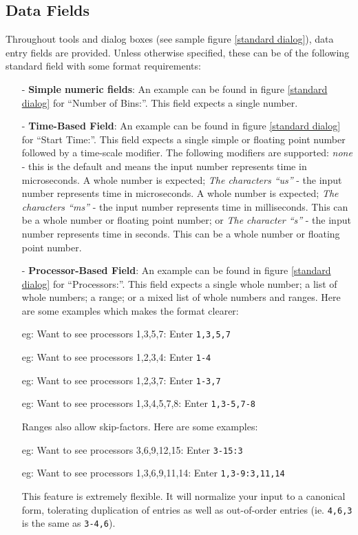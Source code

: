 \documentclass[10pt]{report}
\begin{document}
\subsection{Data Fields}

Throughout \projections{} tools and dialog boxes (see sample figure
\ref{standard dialog}), data entry fields are provided. Unless
otherwise specified, these can be of the following standard field with
some format requirements:

\begin{itemize}
\item[-] {\bf Simple numeric fields}: An example can be found in
figure \ref{standard dialog} for ``Number of Bins:''. This field expects
a single number.
\item[-] {\bf Time-Based Field}: An example can be found in figure
\ref{standard dialog} for ``Start Time:''. This field expects a single
simple or floating point number followed by a time-scale modifier. The
following modifiers are supported: {\it none} - this is the default
and means the input number represents time in microseconds. A whole
number is expected; {\it The characters ``us''} - the input number
represents time in microseconds. A whole number is expected; {\it The
characters ``ms''} - the input number represents time in
milliseconds. This can be a whole number or floating point number; or
{\it The character ``s''} - the input number represents time in
seconds. This can be a whole number or floating point number.
\item[-] {\bf Processor-Based Field}: An example can be found in
figure \ref{standard dialog} for ``Processors:''. This field expects a
single whole number; a list of whole numbers; a range; or a mixed list
of whole numbers and ranges. Here are some examples which makes the
format clearer:

   eg: Want to see processors 1,3,5,7:  Enter {\tt 1,3,5,7}

   eg: Want to see processors 1,2,3,4:  Enter {\tt 1-4}

   eg: Want to see processors 1,2,3,7:  Enter {\tt 1-3,7}

   eg: Want to see processors 1,3,4,5,7,8: Enter {\tt 1,3-5,7-8}

Ranges also allow skip-factors. Here are some examples:

   eg: Want to see processors 3,6,9,12,15: Enter {\tt 3-15:3}

   eg: Want to see processors 1,3,6,9,11,14: Enter {\tt 1,3-9:3,11,14}

This feature is extremely flexible. It will normalize your input to a
canonical form, tolerating duplication of entries as well as
out-of-order entries (ie. {\tt 4,6,3} is the same as {\tt 3-4,6}).
\end{itemize}
\end{document}
